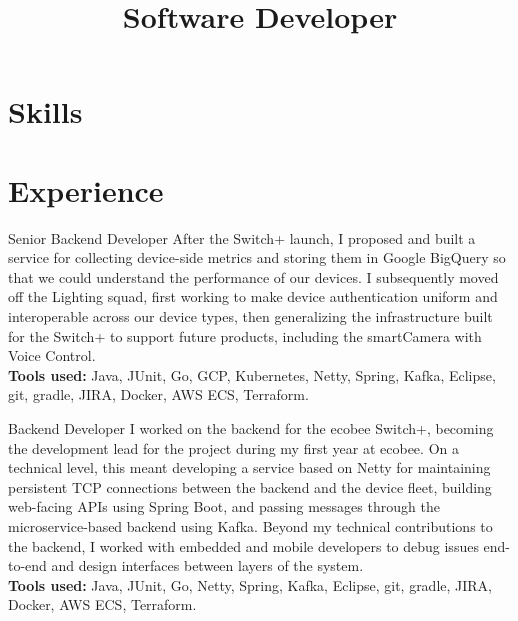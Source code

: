 \documentclass[11pt,letterpaper]{moderncv}
\title{Software Developer}
\begin{document}
\maketitle

\section{Skills}


\section{Experience}

{Senior Backend Developer}
{}
{}{}
{
After the Switch+ launch, I proposed and built a service for collecting device-side metrics and storing them in Google BigQuery so that we could understand the performance of our devices. I subsequently moved off the Lighting squad, first working to make device authentication uniform and interoperable across our device types, then generalizing the infrastructure built for the Switch+ to support future products, including the smartCamera with Voice Control. \\
\textbf{Tools used:} Java, JUnit, Go, GCP, Kubernetes, Netty, Spring, Kafka, Eclipse, git, gradle, JIRA, Docker, AWS ECS, Terraform.
}

{Backend Developer}
{}
{}{}
{
I worked on the backend for the ecobee Switch+, becoming the development lead for the project during my first year at ecobee. On a technical level, this meant developing a service based on Netty for maintaining persistent TCP connections between the backend and the device fleet, building web-facing APIs using Spring Boot, and passing messages through the microservice-based backend using Kafka. Beyond my technical contributions to the backend, I worked with embedded and mobile developers to debug issues end-to-end and design interfaces between layers of the system. \\
\textbf{Tools used:} Java, JUnit, Go, Netty, Spring, Kafka, Eclipse, git, gradle, JIRA, Docker, AWS ECS, Terraform.
}
\end{document}
